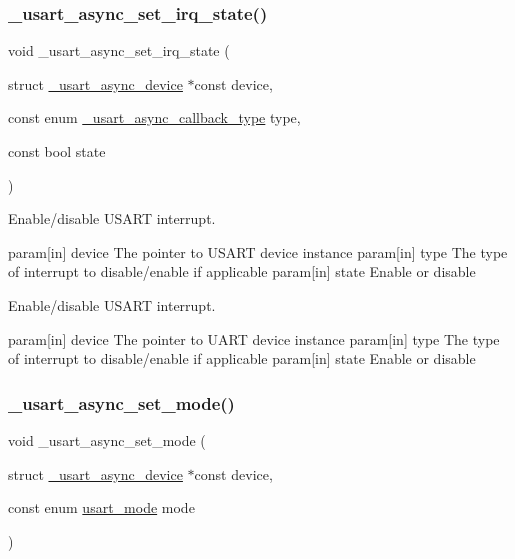 \subsubsection{\texorpdfstring{\+\_\+usart\+\_\+async\+\_\+set\+\_\+irq\+\_\+state()}{\_usart\_async\_set\_irq\_state()}}
{\footnotesize\ttfamily void \+\_\+usart\+\_\+async\+\_\+set\+\_\+irq\+\_\+state (\begin{DoxyParamCaption}\item[{struct \hyperlink{struct__usart__async__device}{\+\_\+usart\+\_\+async\+\_\+device} $\ast$const}]{device,  }\item[{const enum \hyperlink{group___h_p_l_gace00dc77ac02c91f8bf35551b484927c}{\+\_\+usart\+\_\+async\+\_\+callback\+\_\+type}}]{type,  }\item[{const bool}]{state }\end{DoxyParamCaption})}



Enable/disable U\+S\+A\+RT interrupt. 

param\mbox{[}in\mbox{]} device The pointer to U\+S\+A\+RT device instance param\mbox{[}in\mbox{]} type The type of interrupt to disable/enable if applicable param\mbox{[}in\mbox{]} state Enable or disable

Enable/disable U\+S\+A\+RT interrupt.

param\mbox{[}in\mbox{]} device The pointer to U\+A\+RT device instance param\mbox{[}in\mbox{]} type The type of interrupt to disable/enable if applicable param\mbox{[}in\mbox{]} state Enable or disable \mbox{\label{group___h_p_l_ga90f1288d1ba0ab800801db3124f6a1cc}} 
\subsubsection{\texorpdfstring{\+\_\+usart\+\_\+async\+\_\+set\+\_\+mode()}{\_usart\_async\_set\_mode()}}
{\footnotesize\ttfamily void \+\_\+usart\+\_\+async\+\_\+set\+\_\+mode (\begin{DoxyParamCaption}\item[{struct \hyperlink{struct__usart__async__device}{\+\_\+usart\+\_\+async\+\_\+device} $\ast$const}]{device,  }\item[{const enum \hyperlink{group___h_p_l_ga1c465965478e0f6908a4c99d4f3ad20f}{usart\+\_\+mode}}]{mode }\end{DoxyParamCaption})}



